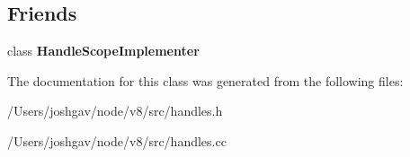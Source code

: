 \subsection*{Friends}
\begin{DoxyCompactItemize}
\item 
class {\bfseries Handle\+Scope\+Implementer}\hypertarget{classv8_1_1internal_1_1_deferred_handle_scope_a4212b6d1addb496cb92d67a2e399a1f3}{}\label{classv8_1_1internal_1_1_deferred_handle_scope_a4212b6d1addb496cb92d67a2e399a1f3}

\end{DoxyCompactItemize}


The documentation for this class was generated from the following files\+:\begin{DoxyCompactItemize}
\item 
/\+Users/joshgav/node/v8/src/handles.\+h\item 
/\+Users/joshgav/node/v8/src/handles.\+cc\end{DoxyCompactItemize}
